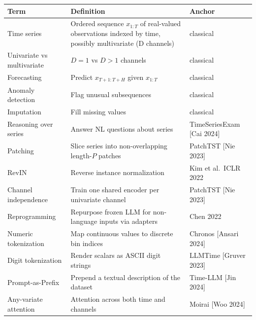 {\def\LTcaptype{none} %
\begin{longtable}[]{@{}
  >{\raggedright\arraybackslash}p{}
  >{\raggedright\arraybackslash}p{}
  >{\raggedright\arraybackslash}p{}@{}}
\toprule\noalign{}
\begin{minipage}[b]{\linewidth}\raggedright
Term
\end{minipage} & \begin{minipage}[b]{\linewidth}\raggedright
Definition
\end{minipage} & \begin{minipage}[b]{\linewidth}\raggedright
Anchor
\end{minipage} \\
\midrule\noalign{}
\endhead
\bottomrule\noalign{}
\endlastfoot
Time series & Ordered sequence \(x_{1:T}\) of real-valued observations indexed by time, possibly multivariate (D channels) & classical \\
Univariate vs multivariate & \(D=1\) vs \(D>1\) channels & classical \\
Forecasting & Predict \(x_{T+1:T+H}\) given \(x_{1:T}\) & classical \\
Anomaly detection & Flag unusual subsequences & classical \\
Imputation & Fill missing values & classical \\
Reasoning over series & Answer NL questions about series & TimeSeriesExam {[}Cai 2024{]} \\
Patching & Slice series into non-overlapping length-\(P\) patches & PatchTST {[}Nie 2023{]} \\
RevIN & Reverse instance normalization & Kim et al.~ICLR 2022 \\
Channel independence & Train one shared encoder per univariate channel & PatchTST {[}Nie 2023{]} \\
Reprogramming & Repurpose frozen LLM for non-language inputs via adapters & Chen 2022 \\
Numeric tokenization & Map continuous values to discrete bin indices & Chronos {[}Ansari 2024{]} \\
Digit tokenization & Render scalars as ASCII digit strings & LLMTime {[}Gruver 2023{]} \\
Prompt-as-Prefix & Prepend a textual description of the dataset & Time-LLM {[}Jin 2024{]} \\
Any-variate attention & Attention across both time and channels & Moirai {[}Woo 2024{]} \\

\end{longtable}}
